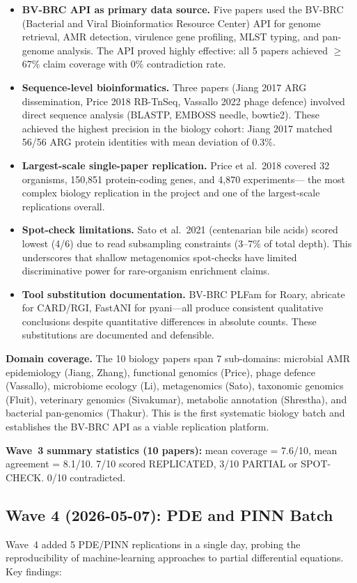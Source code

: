 \begin{itemize}
\item \textbf{BV-BRC API as primary data source.} Five papers used the BV-BRC
(Bacterial and Viral Bioinformatics Resource Center) API for genome retrieval,
AMR detection, virulence gene profiling, MLST typing, and pan-genome
analysis. The API proved highly effective: all 5 papers achieved $\geq$67\%
claim coverage with 0\% contradiction rate.
\item \textbf{Sequence-level bioinformatics.} Three papers (Jiang 2017 ARG
dissemination, Price 2018 RB-TnSeq, Vassallo 2022 phage defence) involved
direct sequence analysis (BLASTP, EMBOSS needle, bowtie2). These achieved
the highest precision in the biology cohort: Jiang 2017 matched 56/56 ARG
protein identities with mean deviation of 0.3\%.
\item \textbf{Largest-scale single-paper replication.} Price et al.\ 2018
covered 32 organisms, 150,851 protein-coding genes, and 4,870 experiments---
the most complex biology replication in the project and one of the
largest-scale replications overall.
\item \textbf{Spot-check limitations.} Sato et al.\ 2021 (centenarian bile
acids) scored lowest (4/6) due to read subsampling constraints (3--7\% of
total depth). This underscores that shallow metagenomics spot-checks have
limited discriminative power for rare-organism enrichment claims.
\item \textbf{Tool substitution documentation.} BV-BRC PLFam for Roary,
abricate for CARD/RGI, FastANI for pyani---all produce consistent
qualitative conclusions despite quantitative differences in absolute counts.
These substitutions are documented and defensible.
\end{itemize}

\noindent\textbf{Domain coverage.} The 10 biology papers span 7 sub-domains:
microbial AMR epidemiology (Jiang, Zhang), functional genomics (Price),
phage defence (Vassallo), microbiome ecology (Li), metagenomics (Sato),
taxonomic genomics (Fluit), veterinary genomics (Sivakumar), metabolic
annotation (Shrestha), and bacterial pan-genomics (Thakur). This is the
first systematic biology batch and establishes the BV-BRC API as a viable
replication platform.

\noindent\textbf{Wave~3 summary statistics (10 papers):}
mean coverage = 7.6/10, mean agreement = 8.1/10.
7/10 scored REPLICATED, 3/10 PARTIAL or SPOT-CHECK.
0/10 contradicted.

\subsection{Wave 4 (2026-05-07): PDE and PINN Batch}
Wave~4 added 5 PDE/PINN replications in a single day, probing the
reproducibility of machine-learning approaches to partial differential
equations. Key findings:


